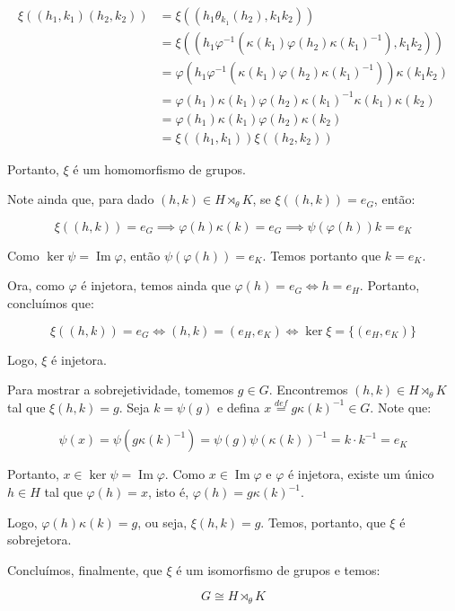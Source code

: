 \documentclass[16pt,openany]{book}
\theoremstyle{definition}
\begin{document}
\[
\begin{aligned}
\xi\left((h_1,k_1)(h_2,k_2)\right) &= \xi\left((h_1\theta_{k_1}(h_2), k_1k_2)\right) \\
&= \xi\left((h_1\varphi^{-1}\left(\kappa(k_1)\varphi(h_2)\kappa(k_1)^{-1}\right), k_1k_2)\right) \\
&= \varphi\left(h_1\varphi^{-1}\left(\kappa(k_1)\varphi(h_2)\kappa(k_1)^{-1}\right)\right)\kappa(k_1k_2) \\
&= \varphi(h_1)\kappa(k_1)\varphi(h_2)\kappa(k_1)^{-1}\kappa(k_1)\kappa(k_2) \\
&= \varphi(h_1)\kappa(k_1)\varphi(h_2)\kappa(k_2) \\
&= \xi((h_1,k_1))\xi((h_2,k_2))
\end{aligned}
\]

Portanto, $\xi$ é um homomorfismo de grupos.

Note ainda que, para dado $(h,k)\in H\rtimes_\theta K$, se $\xi\left((h,k)\right) = e_G$, então:

\[
\xi\left((h,k)\right) = e_G \implies \varphi(h)\kappa(k) = e_G \implies \psi(\varphi(h))k = e_K
\]

Como $\ker{\psi} = \operatorname{Im}{\varphi}$, então $\psi(\varphi(h)) = e_K$. Temos portanto que $k=e_K$.

Ora, como $\varphi$ é injetora, temos ainda que $\varphi(h) = e_G \iff h = e_H$. Portanto, concluímos que:

\[
\xi\left((h,k)\right) = e_G \iff (h,k) = (e_H, e_K) \iff \ker{\xi} = \{(e_H,e_K)\}
\]

Logo, $\xi$ é injetora.

Para mostrar a sobrejetividade, tomemos $g \in G$. Encontremos $(h, k) \in H \rtimes_\theta K$ tal que $\xi(h, k) = g$. 
Seja $k = \psi(g)$ e defina $x \overset{def}{=} g\kappa(k)^{-1} \in G$. Note que:

\[
\psi(x) = \psi(g\kappa(k)^{-1}) = \psi(g)\psi(\kappa(k))^{-1} = k \cdot k^{-1} = e_K
\]

Portanto, $x \in \ker{\psi} = \operatorname{Im}{\varphi}$. Como $x\in \operatorname{Im}{\varphi}$ e $\varphi$ é injetora, existe um único $h \in H$ tal que $\varphi(h) = x$, isto é, $\varphi(h) = g\kappa(k)^{-1}$. 

Logo, $\varphi(h)\kappa(k) = g$, ou seja, $\xi(h, k) = g$. Temos, portanto, que $\xi$ é sobrejetora.

Concluímos, finalmente, que $\xi$ é um isomorfismo de grupos e temos:

\[
G \cong H \rtimes_\theta K
\]
\end{document}
